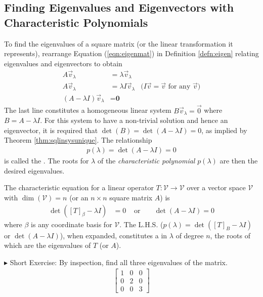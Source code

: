 \subsection{Finding Eigenvalues and Eigenvectors with Characteristic Polynomials}

To find the eigenvalues of a square matrix (or the linear transformation it represents), rearrange Equation (\ref{eqn:eigenmat}) in Definition \ref{defn:eigen} relating eigenvalues and eigenvectors to obtain
\begin{align}
A\vec{v}_\lambda &= \lambda\vec{v}_\lambda \nonumber \\
A\vec{v}_\lambda &= \lambda I\vec{v}_\lambda  &\text{($I\vec{v} = \vec{v}$ for any $\vec{v}$)} \nonumber  \\
(A-\lambda I)\vec{v}_\lambda &= \textbf{0} \label{eqn:eigenminus}
\end{align}
The last line constitutes a homogeneous linear system $B\vec{v}_\lambda = \vec{0}$ where $B = A - \lambda I$. For this system to have a non-trivial solution and hence an eigenvector, it is required that $\det(B) = \det(A - \lambda I) = 0$, as implied by Theorem \ref{thm:sqlinsysunique}. The relationship 
\begin{align}
p(\lambda) = \det(A - \lambda I) = 0    
\end{align}
is called the . The roots for $\lambda$ of the \textit{characteristic polynomial} $p(\lambda)$ are then the desired eigenvalues.
\begin{defn}
\label{defn:charactereqn}
The characteristic equation for a linear operator $T: \mathcal{V} \to \mathcal{V}$ over a vector space $\mathcal{V}$ with $\dim(\mathcal{V}) = n$ (or an $n \times n$ square matrix $A$) is
\begin{align*}
\det([T]_\beta - \lambda I) &= 0 & \text{ or } & & \det(A-\lambda I) = 0
\end{align*}
where $\mathcal{\beta}$ is any coordinate basis for $\mathcal{V}$. The L.H.S. ($p(\lambda) = \det([T]_B - \lambda I)$ or $\det(A-\lambda I)$), when expanded, constitutes a  in $\lambda$ of degree $n$, the roots of which are the eigenvalues of $T$ (or $A$).
\end{defn}
$\blacktriangleright$ Short Exercise: By inspection, find all three eigenvalues of the matrix.\footnotemark
\begin{align*}
\begin{bmatrix}
1 & 0 & 0 \\
0 & 2 & 0 \\
0 & 0 & 3
\end{bmatrix}
\end{align*}
